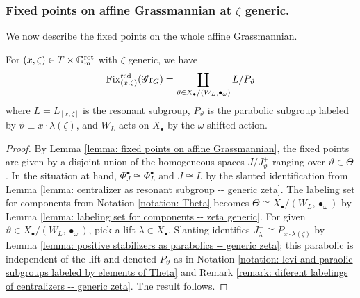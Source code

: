 \subsubsection{Fixed points on affine Grassmannian at \texorpdfstring{$\zeta$}{zeta} generic.}
We now describe the fixed points on the whole affine Grassmannian.
\begin{theorem}\label{lemma: fixed points of (c, zeta) on Gr_G -- zeta generic}
For $(x, \zeta) \in T \times \mathbb{G}_m^{\mathrm{rot}}$ with $\zeta$ generic, we have
\begin{equation}\label{equation: fixed points of (x, zeta) on Gr_G -- zeta generic}
    \operatorname{Fix}^{\operatorname{red}}_{(x, \zeta)}(\operatorname{\mathscr{G}r}_G) = \coprod_{\vartheta \in X_{\bullet}/(W_{L}, \bullet_{\omega})} L/P_{\vartheta}
\end{equation}
where $L = L_{[x, \zeta]}$ is the resonant subgroup, $P_{\vartheta}$ is the parabolic subgroup labeled by $\vartheta \equiv x \cdot \lambda(\zeta)$, and $W_L$ acts on $X_{\bullet}$ by the $\omega$-shifted action.
\end{theorem}
\begin{proof}
By Lemma \ref{lemma: fixed points on affine Grassmannian}, the fixed points are given by a disjoint union of the homogeneous spaces $J/J^+_{\vartheta}$ ranging over $\vartheta \in \Theta$.
In the situation at hand, $\Phi^{\bullet}_J \cong \Phi^{\bullet}_L$ and $J \cong L$ by the slanted identification from Lemma \ref{lemma: centralizer as resonant subgroup -- generic zeta}. The labeling set for components from Notation \ref{notation: Theta} becomes $\Theta \cong X_{\bullet} / (W_L, \bullet_{\omega})$ by Lemma \ref{lemma: labeling set for components -- zeta generic}. For given $\vartheta \in X_{\bullet} / (W_L, \bullet_{\omega})$, pick a lift $\lambda \in X_{\bullet}$. Slanting identifies $J^+_{\lambda} \cong P_{x \cdot \lambda(\zeta)}$ by Lemma \ref{lemma: positive stabilizers as parabolics -- generic zeta}; this parabolic is independent of the lift and denoted $P_{\vartheta}$ as in Notation \ref{notation: levi and paraolic subgroups labeled by elements of Theta} and Remark \ref{remark: diferent labelings of centralizers -- generic zeta}. The result follows.
\end{proof}




